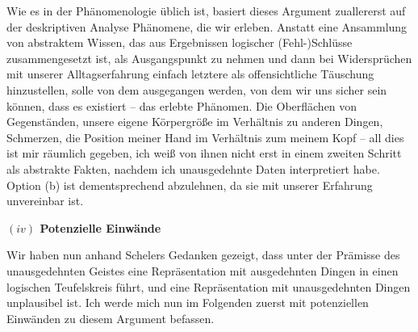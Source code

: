 \documentclass[a4paper, 12pt]{article}
\begin{document}
\begin{onehalfspace}

Wie es in der Phänomenologie üblich ist, basiert dieses Argument zuallererst auf der deskriptiven Analyse Phänomene, die wir erleben. Anstatt eine Ansammlung von abstraktem Wissen, das aus Ergebnissen logischer (Fehl-)Schlüsse zusammengesetzt ist, als Ausgangspunkt zu nehmen und dann bei Widersprüchen mit unserer Alltagserfahrung einfach letztere als offensichtliche Täuschung hinzustellen, solle von dem ausgegangen werden, von dem wir uns sicher sein können, dass es existiert -- das erlebte Phänomen. Die Oberflächen von Gegenständen, unsere eigene Körpergröße im Verhältnis zu anderen Dingen, Schmerzen, die Position meiner Hand im Verhältnis zum meinem Kopf -- all dies ist mir räumlich gegeben, ich weiß von ihnen nicht erst in einem zweiten Schritt als abstrakte Fakten, nachdem ich unausgedehnte Daten interpretiert habe. Option (b) ist dementsprechend abzulehnen, da sie mit unserer Erfahrung unvereinbar ist.

\vspace{5mm}
\noindent\textbf{$(iv)$ Potenzielle Einwände} 


\noindent Wir haben nun anhand Schelers Gedanken gezeigt, dass unter der Prämisse des unausgedehnten Geistes eine Repräsentation mit ausgedehnten Dingen in einen logischen Teufelskreis führt, und eine Repräsentation mit unausgedehnten Dingen unplausibel ist. Ich werde mich nun im Folgenden zuerst mit potenziellen Einwänden zu diesem Argument befassen.



\end{onehalfspace}
\end{document}
